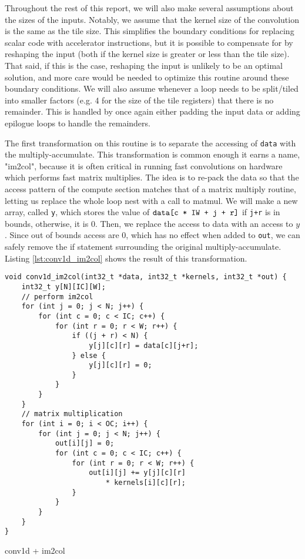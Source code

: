 \documentclass[acmsmall, nonacm=true]{acmart}
\begin{document}
Throughout the rest of this report, we will also make several assumptions about the sizes of the inputs. Notably, we assume that the kernel size of the convolution is the same as the tile size. This simplifies the boundary conditions for replacing scalar code with accelerator instructions, but it is possible to compensate for by reshaping the input (both if the kernel size is greater or less than the tile size). That said, if this is the case, reshaping the input is unlikely to be an optimal solution, and more care would be needed to optimize this routine around these boundary conditions. We will also assume whenever a loop needs to be split/tiled into smaller factors (e.g. 4 for the size of the tile registers) that there is no remainder. This is handled by once again either padding the input data or adding epilogue loops to handle the remainders.

The first transformation on this routine is to separate the accessing of \verb|data| with the multiply-accumulate. This transformation is common enough it earns a name, "im2col", because it is often critical in running fast convolutions on hardware which performs fast matrix multiplies. The idea is to re-pack the data so that the access pattern of the compute section matches that of a matrix multiply routine, letting us replace the whole loop nest with a call to matmul. We will make a new array, called \verb|y|, which stores the value of $\verb|data[c * IW + j + r]|$ if \verb|j+r| is in bounds, otherwise, it is 0. Then, we replace the access to data with an access to $y$. Since out of bounds access are $0$, which has no effect when added to \verb|out|, we can safely remove the if statement surrounding the original multiply-accumulate. Listing \ref{lst:conv1d_im2col} shows the result of this transformation.

\begin{listing}
    \centering
    \begin{verbatim}
void conv1d_im2col(int32_t *data, int32_t *kernels, int32_t *out) {
    int32_t y[N][IC][W];
    // perform im2col
    for (int j = 0; j < N; j++) {
        for (int c = 0; c < IC; c++) {
            for (int r = 0; r < W; r++) {
                if ((j + r) < N) {
                    y[j][c][r] = data[c][j+r];
                } else {
                    y[j][c][r] = 0;
                }                    
            }
        }
    }
    // matrix multiplication
    for (int i = 0; i < OC; i++) {
        for (int j = 0; j < N; j++) {
            out[i][j] = 0;
            for (int c = 0; c < IC; c++) {
                for (int r = 0; r < W; r++) {
                    out[i][j] += y[j][c][r]
                        * kernels[i][c][r];
                }
            }
        }
    }
}
\end{verbatim}
    \caption{conv1d + im2col}
    \label{lst:conv1d_im2col}
\end{listing}
\end{document}
